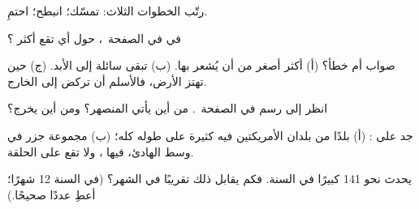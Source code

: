 \begin{exercise}[$\star$]\label{exo:g4:volcanoes-earthquakes-first-look:3}
رتّب الخطوات الثلاث: تمسّك؛ انبطح؛ احتمِ.
\end{exercise}

\begin{exercise}[$\star$]\label{exo:g4:volcanoes-earthquakes-first-look:4}
في  في الصفحة~\pageref{fig:g4:volcanoes-earthquakes-first-look:map}، حول
أي  تقع أكثر ؟
\end{exercise}

\begin{exercise}[$\star$]\label{exo:g4:volcanoes-earthquakes-first-look:5}
صواب أم خطأ؟ (أ) أكثر  أصغر من أن يُشعر بها. (ب) تبقى 
سائلة إلى الأبد. (ج) حين تهتز الأرض، فالأسلم أن تركض
إلى الخارج.
\end{exercise}

\begin{exercise}[$\star$]\label{exo:g4:volcanoes-earthquakes-first-look:6}
انظر إلى رسم  في الصفحة~\pageref{fig:g4:volcanoes-earthquakes-first-look:volcano}.
من أين يأتي  المنصهر؟ ومن أين يخرج؟
\end{exercise}

\begin{exercise}[$\star\star$]\label{exo:g4:volcanoes-earthquakes-first-look:7}
جد على : (أ) بلدًا من بلدان الأمريكتين فيه  كثيرة على
طوله كله؛ (ب) مجموعة جزر في وسط  الهادئ،
فيها ، ولا تقع على الحلقة.
\end{exercise}

\begin{exercise}[$\star\star$]\label{exo:g4:volcanoes-earthquakes-first-look:8}
يحدث نحو 141  كبيرًا في السنة. فكم  يقابل ذلك تقريبًا في
الشهر؟ (في السنة 12 شهرًا؛ أعطِ عددًا صحيحًا.)
\end{exercise}

